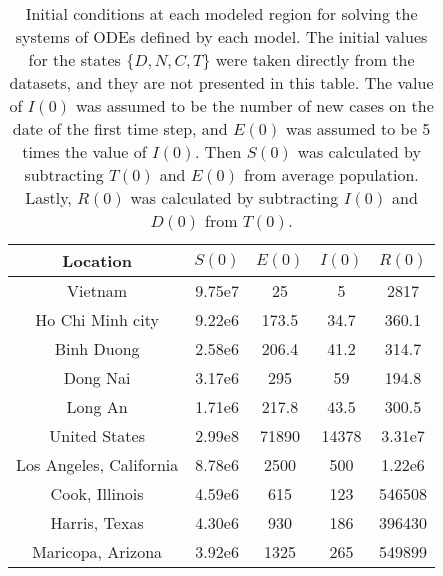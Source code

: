 \begin{table}[h]
    \centering
    \begin{tabular}{| c | c | c | c | c |}
        Location & $S(0)$ & $E(0)$ & $I(0)$ & $R(0)$ \\
        \hline\hline
        Vietnam & 9.75e7 & 25 & 5 & 2817 \\
        \hline
        Ho Chi Minh city & 9.22e6 & 173.5 & 34.7 & 360.1 \\
        \hline
        Binh Duong & 2.58e6 & 206.4 & 41.2 & 314.7 \\
        \hline
        Dong Nai & 3.17e6 & 295 & 59 & 194.8 \\
        \hline
        Long An & 1.71e6 & 217.8 & 43.5 & 300.5 \\
        \hline
        United States & 2.99e8 & 71890 & 14378 & 3.31e7 \\
        \hline
        Los Angeles, California & 8.78e6 & 2500 & 500 & 1.22e6 \\
        \hline
        Cook, Illinois & 4.59e6 & 615 & 123 & 546508 \\
        \hline
        Harris, Texas & 4.30e6 & 930 & 186 & 396430 \\
        \hline
        Maricopa, Arizona & 3.92e6 & 1325 & 265 & 549899 \\
        \hline
    \end{tabular}
    \caption{Initial conditions at each modeled region for solving the systems of \glspl{ODE} defined by each model. The initial values for the states $\{D, N, C, T\}$ were taken directly from the datasets, and they are not presented in this table. The value of $I(0)$ was assumed to be the number of new cases on the date of the first time step, and $E(0)$ was assumed to be 5 times the value of $I(0)$. Then $S(0)$ was calculated by subtracting $T(0)$ and $E(0)$ from average population. Lastly, $R(0)$ was calculated by subtracting $I(0)$ and $D(0)$ from $T(0)$.}
    \label{tab:ude-model-initial-conditions}
\end{table}

